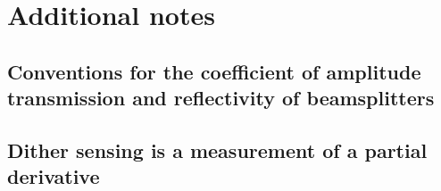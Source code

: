 \chapter{Additional notes}

\section{Conventions for the coefficient of amplitude transmission and reflectivity of beamsplitters}

\section{Dither sensing is a measurement of a partial derivative}

